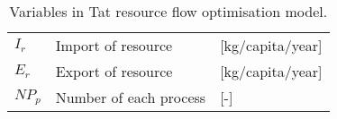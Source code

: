 	\begin{table}[h]
		\centering
		\caption{Variables in Tat resource flow optimisation model.} \label{tab:tat_vars}
			\begin{tabular}{lll}
			\toprule
			$I_r$ & Import of resource & [kg/capita/year]\\ 
			$E_r$ & Export of resource & [kg/capita/year] \\
			$NP_p$ & Number of each process & [-] \\
			\bottomrule
			\end{tabular}
	\end{table}


